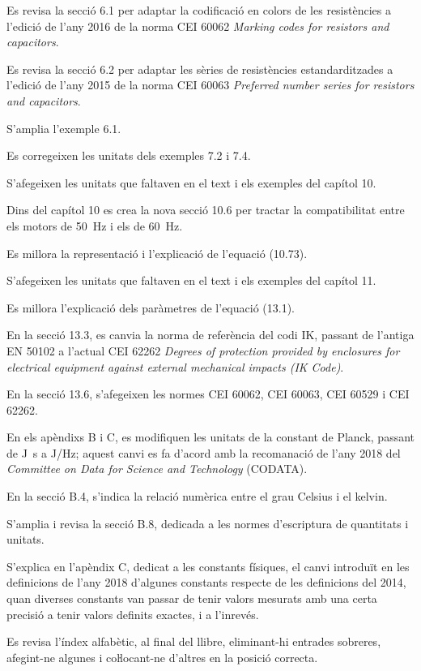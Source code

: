 Es revisa la secció 6.1 per adaptar la codificació en colors de les resistències a l'edició de l'any 2016 de la norma CEI 60062 \textit{Marking codes for resistors and capacitors}.

Es revisa la secció 6.2 per adaptar les sèries de resistències estandarditzades a l'edició de l'any 2015 de la norma CEI 60063 \textit{Preferred number series for resistors and capacitors}.

S'amplia l'exemple 6.1.

Es corregeixen les unitats dels exemples 7.2 i 7.4.

S'afegeixen les unitats que faltaven en el text i els exemples del capítol 10. 

Dins del capítol 10 es crea la nova secció 10.6 per tractar la compatibilitat entre els motors de \qty{50}{Hz} i els de \qty{60}{Hz}.

Es millora la representació i l'explicació de l'equació (10.73).

S'afegeixen les unitats que faltaven en el text i els exemples del capítol 11.

Es millora l'explicació dels paràmetres de l'equació  (13.1).

En la  secció 13.3, es canvia la norma de referència del codi IK, passant de l'antiga EN 50102 a l'actual CEI 62262 \textit{Degrees of protection provided by enclosures for
electrical equipment against external mechanical impacts (IK Code)}.

En la secció 13.6, s'afegeixen les normes CEI 60062,  CEI 60063,  CEI 60529 i  CEI 62262.

En els apèndixs  B i C, es modifiquen les unitats de la constant de Planck, passant de \unit{J.s} a \unit{J/Hz}; aquest canvi es fa d'acord amb  la recomanació de l'any 2018 del \textit{Committee on Data for Science and Technology} (CODATA).

En la secció B.4, s'indica la relació numèrica entre el grau Celsius i el kelvin.

S'amplia i revisa la secció B.8, dedicada a les normes d'escriptura de quantitats i unitats.


S'explica en l'apèndix C, dedicat a les constants físiques,  el canvi introduït en les definicions de l'any 2018 d'algunes constants respecte de les definicions del 2014, quan diverses constants  van passar de tenir valors mesurats amb una certa precisió a tenir valors definits exactes, i a l'inrevés.

Es revisa l'índex alfabètic, al final del llibre, eliminant-hi entrades sobreres, afegint-ne algunes i coŀlocant-ne d'altres en la posició correcta.


